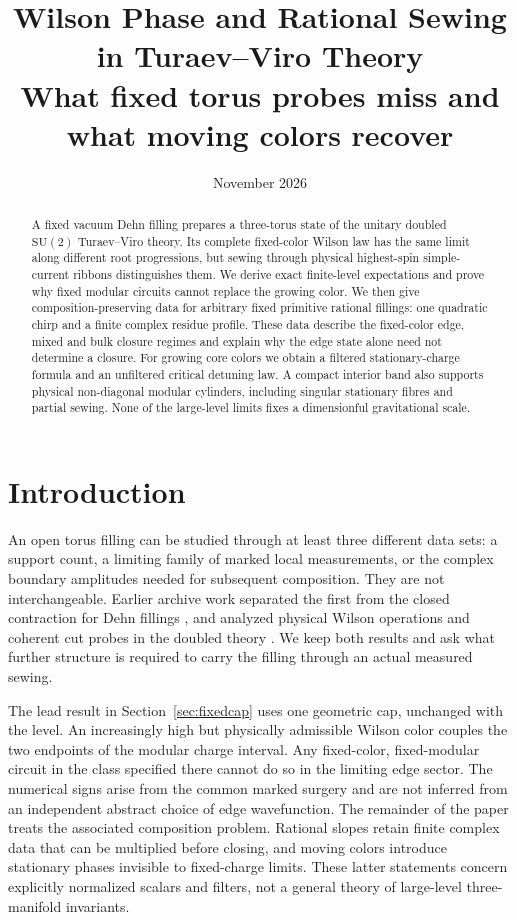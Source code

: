 \documentclass[11pt]{article}
\title{Wilson Phase and Rational Sewing in Turaev--Viro Theory\\[3pt]\large What fixed torus probes miss and what moving colors recover}
\author{}
\date{November 2026}
\begin{document}
\maketitle
\begin{abstract}
A fixed vacuum Dehn filling prepares a three-torus state of the unitary doubled \(\mathrm{SU}(2)\) Turaev--Viro theory. Its complete fixed-color Wilson law has the same limit along different root progressions, but sewing through physical highest-spin simple-current ribbons distinguishes them. We derive exact finite-level expectations and prove why fixed modular circuits cannot replace the growing color. We then give composition-preserving data for arbitrary fixed primitive rational fillings: one quadratic chirp and a finite complex residue profile. These data describe the fixed-color edge, mixed and bulk closure regimes and explain why the edge state alone need not determine a closure. For growing core colors we obtain a filtered stationary-charge formula and an unfiltered critical detuning law. A compact interior band also supports physical non-diagonal modular cylinders, including singular stationary fibres and partial sewing. None of the large-level limits fixes a dimensionful gravitational scale.
\end{abstract}

\section{Introduction}
An open torus filling can be studied through at least three different data sets: a support count, a limiting family of marked local measurements, or the complex boundary amplitudes needed for subsequent composition. They are not interchangeable. Earlier archive work separated the first from the closed contraction for Dehn fillings \cite{Archive42}, and analyzed physical Wilson operations and coherent cut probes in the doubled theory \cite{Archive41}. We keep both results and ask what further structure is required to carry the filling through an actual measured sewing.

The lead result in Section~\ref{sec:fixedcap} uses one geometric cap, unchanged with the level. An increasingly high but physically admissible Wilson color couples the two endpoints of the modular charge interval. Any fixed-color, fixed-modular circuit in the class specified there cannot do so in the limiting edge sector. The numerical signs arise from the common marked surgery and are not inferred from an independent abstract choice of edge wavefunction. The remainder of the paper treats the associated composition problem. Rational slopes retain finite complex data that can be multiplied before closing, and moving colors introduce stationary phases invisible to fixed-charge limits. These latter statements concern explicitly normalized scalars and filters, not a general theory of large-level three-manifold invariants.
\end{document}
